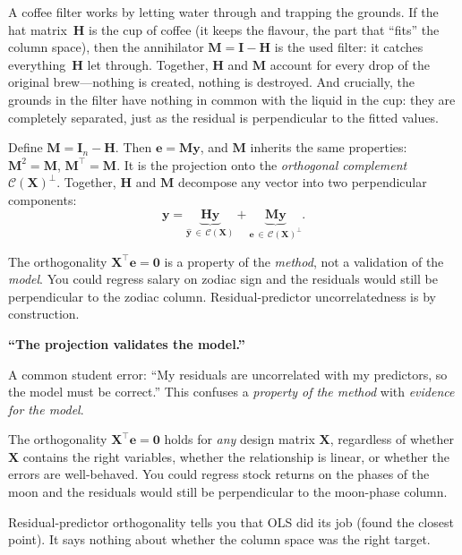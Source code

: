 \documentclass[11pt,a4paper]{article}
\theoremstyle{plain}
\theoremstyle{definition}
\newcommand{\yhat}{\hat{\bm{y}}}
\newcommand{\bX}{\bm{X}}
\newcommand{\by}{\bm{y}}
\newcommand{\be}{\bm{e}}
\newcommand{\bH}{\bm{H}}
\newcommand{\bM}{\bm{M}}
\newcommand{\bI}{\bm{I}}
\newcommand{\Col}{\mathcal{C}}
\begin{document}
\begin{toystory}
A coffee filter works by letting water through and trapping the grounds.
If the hat matrix~$\bH$ is the cup of coffee (it keeps the flavour, the
part that ``fits'' the column space), then the annihilator
$\bM = \bI - \bH$ is the used filter: it catches everything~$\bH$ let
through.  Together, $\bH$ and $\bM$ account for every drop of the
original brew---nothing is created, nothing is destroyed.  And
crucially, the grounds in the filter have nothing in common with the
liquid in the cup: they are completely separated, just as the residual
is perpendicular to the fitted values.
\end{toystory}

Define $\bM = \bI_n - \bH$. Then $\be = \bM\by$, and $\bM$ inherits the
same properties: $\bM^2 = \bM$, $\bM^\top = \bM$.
It is the projection onto the \emph{orthogonal complement}
$\Col(\bX)^\perp$.
Together, $\bH$ and $\bM$ decompose any vector into two perpendicular
components:
\[
  \by = \underbrace{\bH\by}_{\yhat\,\in\,\Col(\bX)}
      + \underbrace{\bM\by}_{\be\,\in\,\Col(\bX)^\perp}.
\]

\begin{warning}
The orthogonality $\bX^\top\be=\bm{0}$ is a property of the
\emph{method}, not a validation of the \emph{model}.
You could regress salary on zodiac sign and the residuals would still
be perpendicular to the zodiac column.
Residual-predictor uncorrelatedness is by construction.
\end{warning}

\begin{misconception}
\textbf{``The projection validates the model.''}

A common student error: ``My residuals are uncorrelated with my
predictors, so the model must be correct.'' This confuses a
\emph{property of the method} with \emph{evidence for the model}.

The orthogonality $\bX^\top \be = \bm{0}$ holds for \emph{any}
design matrix $\bX$, regardless of whether $\bX$ contains the
right variables, whether the relationship is linear, or whether
the errors are well-behaved. You could regress stock returns on
the phases of the moon and the residuals would still be
perpendicular to the moon-phase column.

Residual-predictor orthogonality tells you that OLS did its job
(found the closest point). It says nothing about whether the
column space was the right target.
\end{misconception}
\end{document}
